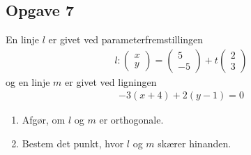 \subsection*{Opgave 7}
En linje $l$ er givet ved parameterfremstillingen
\begin{align*}
	l: \begin{pmatrix}
		x \\ y
	\end{pmatrix}
	=
	\begin{pmatrix}
		5 \\ -5
	\end{pmatrix} +
	t
	\begin{pmatrix}
		2 \\ 3
	\end{pmatrix}
\end{align*}
og en linje $m$ er givet ved ligningen
\begin{align*}
	-3(x+4) + 2(y-1) = 0
\end{align*}
\begin{enumerate}[label=\roman*)]
	\item Afgør, om $l$ og $m$ er orthogonale. 
	\item Bestem det punkt, hvor $l$ og $m$ skærer hinanden. 
\end{enumerate}